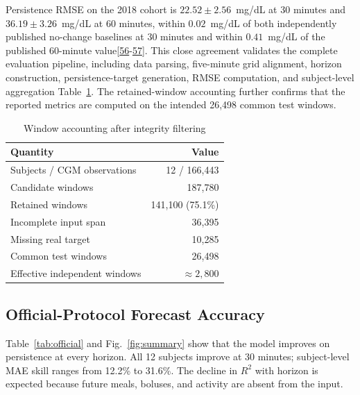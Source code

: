 \documentclass[journal]{IEEEtran}
\begin{document}
Persistence RMSE on the 2018 cohort is $22.52 \pm 2.56$~mg/dL at 30 minutes and $36.19 \pm 3.26$~mg/dL at 60 minutes, within $0.02$~mg/dL of both independently published no-change baselines at 30 minutes and within $0.41$~mg/dL of the published 60-minute value[\hyperref[ref56label]{56}-\hyperref[ref57label]{57}]. This close agreement validates the complete evaluation pipeline, including data parsing, five-minute grid alignment, horizon construction, persistence-target generation, RMSE computation, and subject-level aggregation Table~\ref{tab:windows}. The retained-window accounting further confirms that the reported metrics are computed on the intended 26,498 common test windows. 

\begin{table}[t]
\centering
\caption{Window accounting after integrity filtering}
\label{tab:windows}
\footnotesize
\begin{tabular}{lr}
\toprule
Quantity & Value \\
\midrule
Subjects / CGM observations & 12 / 166,443 \\
Candidate windows & 187,780 \\
Retained windows & 141,100 (75.1\%) \\
Incomplete input span & 36,395 \\
Missing real target & 10,285 \\
Common test windows & 26,498 \\
Effective independent windows & $\approx 2{,}800$ \\
\bottomrule
\end{tabular}
\end{table}

\subsection{Official-Protocol Forecast Accuracy}

Table~\ref{tab:official} and Fig.~\ref{fig:summary} show that the model improves on persistence at every horizon. All 12 subjects improve at 30 minutes; subject-level MAE skill ranges from 12.2\% to 31.6\%. The decline in $R^2$ with horizon is expected because future meals, boluses, and activity are absent from the input.
\end{document}
